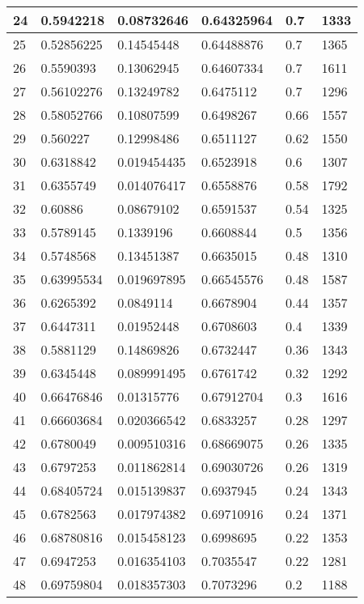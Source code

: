 \begin{longtable}{|l|l|l|l|l|l|}
24 & 0.5942218 & 0.08732646 & 0.64325964 & 0.7 & 1333 \\ \hline 
25 & 0.52856225 & 0.14545448 & 0.64488876 & 0.7 & 1365 \\ \hline 
26 & 0.5590393 & 0.13062945 & 0.64607334 & 0.7 & 1611 \\ \hline 
27 & 0.56102276 & 0.13249782 & 0.6475112 & 0.7 & 1296 \\ \hline 
28 & 0.58052766 & 0.10807599 & 0.6498267 & 0.66 & 1557 \\ \hline 
29 & 0.560227 & 0.12998486 & 0.6511127 & 0.62 & 1550 \\ \hline 
30 & 0.6318842 & 0.019454435 & 0.6523918 & 0.6 & 1307 \\ \hline 
31 & 0.6355749 & 0.014076417 & 0.6558876 & 0.58 & 1792 \\ \hline 
32 & 0.60886 & 0.08679102 & 0.6591537 & 0.54 & 1325 \\ \hline 
33 & 0.5789145 & 0.1339196 & 0.6608844 & 0.5 & 1356 \\ \hline 
34 & 0.5748568 & 0.13451387 & 0.6635015 & 0.48 & 1310 \\ \hline 
35 & 0.63995534 & 0.019697895 & 0.66545576 & 0.48 & 1587 \\ \hline 
36 & 0.6265392 & 0.0849114 & 0.6678904 & 0.44 & 1357 \\ \hline 
37 & 0.6447311 & 0.01952448 & 0.6708603 & 0.4 & 1339 \\ \hline 
38 & 0.5881129 & 0.14869826 & 0.6732447 & 0.36 & 1343 \\ \hline 
39 & 0.6345448 & 0.089991495 & 0.6761742 & 0.32 & 1292 \\ \hline 
40 & 0.66476846 & 0.01315776 & 0.67912704 & 0.3 & 1616 \\ \hline 
41 & 0.66603684 & 0.020366542 & 0.6833257 & 0.28 & 1297 \\ \hline 
42 & 0.6780049 & 0.009510316 & 0.68669075 & 0.26 & 1335 \\ \hline 
43 & 0.6797253 & 0.011862814 & 0.69030726 & 0.26 & 1319 \\ \hline 
44 & 0.68405724 & 0.015139837 & 0.6937945 & 0.24 & 1343 \\ \hline 
45 & 0.6782563 & 0.017974382 & 0.69710916 & 0.24 & 1371 \\ \hline 
46 & 0.68780816 & 0.015458123 & 0.6998695 & 0.22 & 1353 \\ \hline 
47 & 0.6947253 & 0.016354103 & 0.7035547 & 0.22 & 1281 \\ \hline 
48 & 0.69759804 & 0.018357303 & 0.7073296 & 0.2 & 1188 \\ \hline 

\end{longtable}
